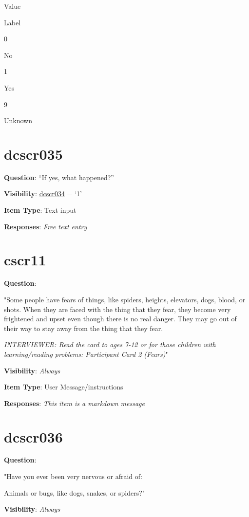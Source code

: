 \documentclass[]{book}
\begin{document}
Value

Label

0

No

1

Yes

9

Unknown

\hypertarget{dcscr035}{%
\section{dcscr035}\label{dcscr035}}

\textbf{Question}: ``If yes, what happened?''

\textbf{Visibility}: \protect\hyperlink{dcscr034}{dcscr034} = `1'

\textbf{Item Type}: Text input

\textbf{Responses}: \emph{Free text entry}

\hypertarget{cscr11}{%
\section{cscr11}\label{cscr11}}

\textbf{Question}:

"Some people have fears of things, like spiders, heights, elevators, dogs, blood, or shots. When they are faced with the thing that they fear, they become very frightened and upset even though there is no real danger. They may go out of their way to stay away from the thing that they fear.

\emph{INTERVIEWER: Read the card to ages 7-12 or for those children with learning/reading problems: Participant Card 2 (Fears)}"

\textbf{Visibility}: \emph{Always}

\textbf{Item Type}: User Message/instructions

\textbf{Responses}: \emph{This item is a markdown message}

\hypertarget{dcscr036}{%
\section{dcscr036}\label{dcscr036}}

\textbf{Question}:

"Have you ever been very nervous or afraid of:

Animals or bugs, like dogs, snakes, or spiders?"

\textbf{Visibility}: \emph{Always}
\end{document}
